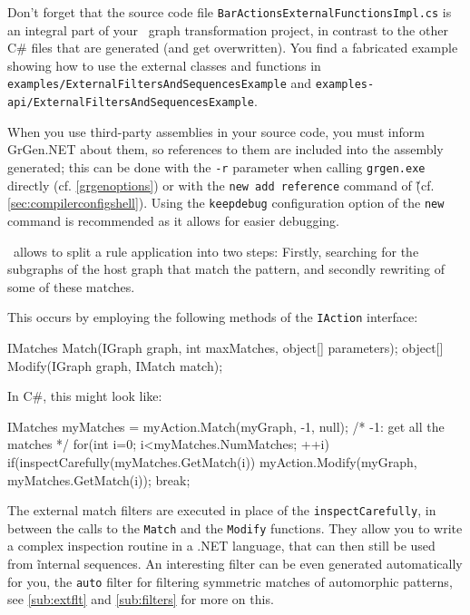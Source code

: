 \noindent Don't forget that the source code file \texttt{Bar\-Actions\-External\-Functions\-Impl.cs} is an integral part of your \GrG~graph transformation project, in contrast to the other C\# files that are generated (and get overwritten).
You find a fabricated example showing how to use the external classes and functions in \texttt{examples/External\-Filters\-And\-Sequences\-Example} and \texttt{examples-api/External\-Filters\-And\-Sequences\-Example}.

When you use third-party assemblies in your source code, you must inform GrGen.NET about them, so references to them are included into the assembly generated; this can be done with the \texttt{-r} parameter when calling \texttt{grgen.exe} directly (cf. \ref{grgenoptions}) or with the \texttt{new add reference} command of \GrShell\~(cf. \ref{sec:compilerconfigshell}). 
Using the \texttt{keepdebug} configuration option of the \texttt{new} command is recommended as it allows for easier debugging.

\begin{note}\label{note:inspect}
\LibGr\ allows to split a rule application into two steps:
Firstly, searching for the subgraphs of the host graph that match the pattern, and secondly rewriting of some of these matches. 

This occurs by employing the following methods of the \texttt{IAction} interface:
\begin{csharplet}
IMatches Match(IGraph graph, int maxMatches, object[] parameters);
object[] Modify(IGraph graph, IMatch match);
\end{csharplet}

In C\#, this might look like:
\begin{csharplet}
IMatches myMatches = myAction.Match(myGraph, -1, null); /* -1: get all the matches */
for(int i=0; i<myMatches.NumMatches; ++i)
{
	if(inspectCarefully(myMatches.GetMatch(i))
	{
		myAction.Modify(myGraph, myMatches.GetMatch(i));
		break;
	}
}
\end{csharplet}

The external match filters are executed in place of the \texttt{inspectCarefully}, in between the calls to the \texttt{Match} and the \texttt{Modify} functions.
They allow you to write a complex inspection routine in a .NET language, that can then still be used from \GrG\~ internal sequences.
An interesting filter can be even generated automatically for you, the \texttt{auto} filter for filtering symmetric matches of automorphic patterns, see \ref{sub:extflt} and \ref{sub:filters} for more on this.
\end{note}


